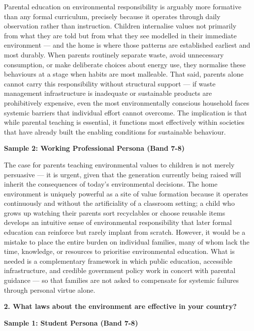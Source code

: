 Parental education on environmental responsibility is arguably more formative than any formal curriculum, precisely because it operates through daily observation rather than instruction. Children internalise values not primarily from what they are told but from what they see modelled in their immediate environment — and the home is where those patterns are established earliest and most durably. When parents routinely separate waste, avoid unnecessary consumption, or make deliberate choices about energy use, they normalise these behaviours at a stage when habits are most malleable. That said, parents alone cannot carry this responsibility without structural support — if waste management infrastructure is inadequate or sustainable products are prohibitively expensive, even the most environmentally conscious household faces systemic barriers that individual effort cannot overcome. The implication is that while parental teaching is essential, it functions most effectively within societies that have already built the enabling conditions for sustainable behaviour.

\textbf{Sample 2: Working Professional Persona (Band 7-8)}

The case for parents teaching environmental values to children is not merely persuasive — it is urgent, given that the generation currently being raised will inherit the consequences of today's environmental decisions. The home environment is uniquely powerful as a site of value formation because it operates continuously and without the artificiality of a classroom setting; a child who grows up watching their parents sort recyclables or choose reusable items develops an intuitive sense of environmental responsibility that later formal education can reinforce but rarely implant from scratch. However, it would be a mistake to place the entire burden on individual families, many of whom lack the time, knowledge, or resources to prioritise environmental education. What is needed is a complementary framework in which public education, accessible infrastructure, and credible government policy work in concert with parental guidance — so that families are not asked to compensate for systemic failures through personal virtue alone.

\separator

\begin{ieltsquestion}
\textbf{2. What laws about the environment are effective in your country?}
\end{ieltsquestion}
\textbf{Sample 1: Student Persona (Band 7-8)}

